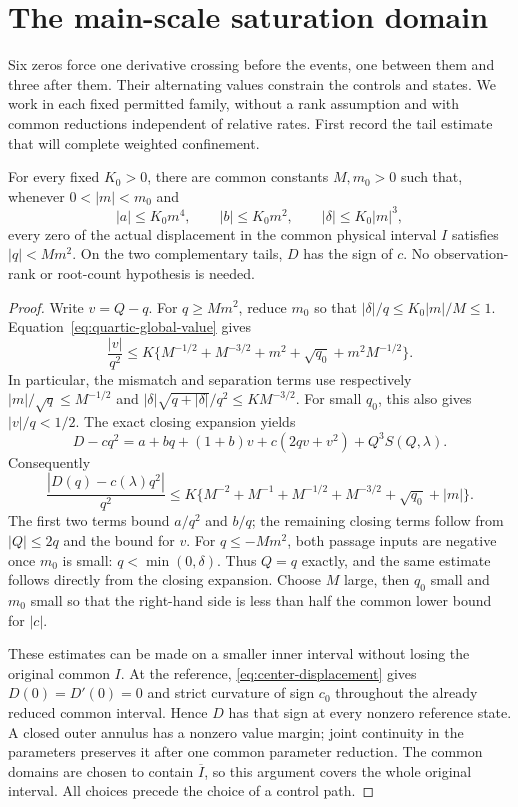 \section{The main-scale saturation domain}\label{sec:main-saturation}
\label{sat:section}

Six zeros force one derivative crossing before the events, one between
them and three after them. Their alternating values constrain the controls
and states. We work in each fixed permitted family, without a rank
assumption and with common reductions independent of relative rates.
First record the tail estimate that will complete weighted confinement.

\begin{lemma}\label{mainloc:tail}
For every fixed $K_0>0$, there are common constants $M,m_0>0$ such
that, whenever $0<|m|<m_0$ and
\[
 |a|\le K_0m^4,\qquad |b|\le K_0m^2,\qquad
 |\delta|\le K_0|m|^3,
\]
every zero of the actual displacement in the common physical interval
$I$ satisfies $|q|<Mm^2$. On the two complementary tails, $D$ has
the sign of $c$. No observation-rank or root-count hypothesis is needed.
\end{lemma}

\begin{proof}
Write $v=Q-q$. For $q\ge Mm^2$, reduce $m_0$ so that
$|\delta|/q\le K_0|m|/M\le1$. Equation~\eqref{eq:quartic-global-value}
gives
\[
 \frac{|v|}{q^2}\le K\{M^{-1/2}+M^{-3/2}+m^2+\sqrt{q_0}
                                      +m^2M^{-1/2}\}.
\]
In particular, the mismatch and separation terms use respectively
$|m|/\sqrt q\le M^{-1/2}$ and
$|\delta|\sqrt{q+|\delta|}/q^2\le KM^{-3/2}$.
For small $q_0$, this also gives $|v|/q<1/2$. The exact closing
expansion yields
\[
 D-cq^2=a+bq+(1+b)v+c(2qv+v^2)+Q^3S(Q,\lambda).
\]
Consequently
\begin{equation}\label{sat:tail-estimate}
 \frac{|D(q)-c(\lambda)q^2|}{q^2}
 \le K\{M^{-2}+M^{-1}+M^{-1/2}+M^{-3/2}
                              +\sqrt{q_0}+|m|\}.
\end{equation}
The first two terms bound $a/q^2$ and $b/q$; the remaining closing
terms follow from $|Q|\le2q$ and the bound for $v$.
For $q\le-Mm^2$, both passage inputs are negative once $m_0$ is
small: $q<\min(0,\delta)$. Thus $Q=q$ exactly, and the same estimate
follows directly from the closing expansion. Choose $M$ large, then
$q_0$ small and $m_0$ small so that the right-hand side is less than
half the common lower bound for $|c|$.

These estimates can be made on a smaller inner interval without losing
the original common $I$. At the reference, \eqref{eq:center-displacement}
gives $D(0)=D'(0)=0$ and strict curvature of sign $c_0$ throughout
the already reduced common interval. Hence $D$ has that sign at every
nonzero reference state. A closed outer annulus has a nonzero value
margin; joint continuity in the parameters preserves it after one common
parameter reduction. The common domains are chosen to contain
$\overline I$, so this argument covers the whole original interval.
All choices precede the choice of a control path.
\end{proof}

